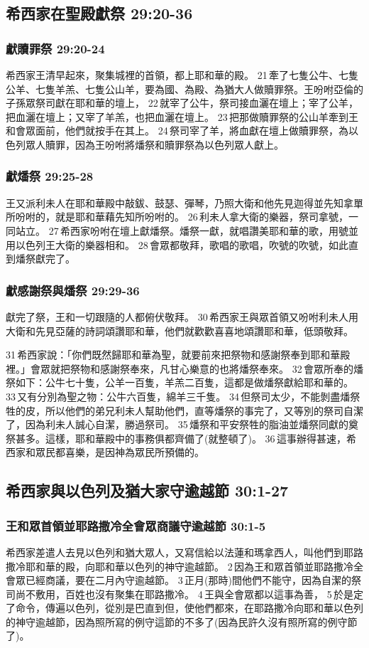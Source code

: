 \subsection{希西家在聖殿獻祭 29:20-36}
\subsubsection{獻贖罪祭 29:20-24}
希西家王清早起來，聚集城裡的首領，都上耶和華的殿。 21 牽了七隻公牛、七隻公羊、七隻羊羔、七隻公山羊，要為國、為殿、為猶大人做贖罪祭。王吩咐亞倫的子孫眾祭司獻在耶和華的壇上， 22 就宰了公牛，祭司接血灑在壇上；宰了公羊，把血灑在壇上；又宰了羊羔，也把血灑在壇上。 23 把那做贖罪祭的公山羊牽到王和會眾面前，他們就按手在其上。 24 祭司宰了羊，將血獻在壇上做贖罪祭，為以色列眾人贖罪，因為王吩咐將燔祭和贖罪祭為以色列眾人獻上。

\subsubsection{獻燔祭 29:25-28}
王又派利未人在耶和華殿中敲鈸、鼓瑟、彈琴，乃照大衛和他先見迦得並先知拿單所吩咐的，就是耶和華藉先知所吩咐的。 26 利未人拿大衛的樂器，祭司拿號，一同站立。 27 希西家吩咐在壇上獻燔祭。燔祭一獻，就唱讚美耶和華的歌，用號並用以色列王大衛的樂器相和。 28 會眾都敬拜，歌唱的歌唱，吹號的吹號，如此直到燔祭獻完了。

\subsubsection{獻感謝祭與燔祭 29:29-36}
獻完了祭，王和一切跟隨的人都俯伏敬拜。 30 希西家王與眾首領又吩咐利未人用大衛和先見亞薩的詩詞頌讚耶和華，他們就歡歡喜喜地頌讚耶和華，低頭敬拜。

31 希西家說：「你們既然歸耶和華為聖，就要前來把祭物和感謝祭奉到耶和華殿裡。」會眾就把祭物和感謝祭奉來，凡甘心樂意的也將燔祭奉來。 32 會眾所奉的燔祭如下：公牛七十隻，公羊一百隻，羊羔二百隻，這都是做燔祭獻給耶和華的。 33 又有分別為聖之物：公牛六百隻，綿羊三千隻。 34 但祭司太少，不能剝盡燔祭牲的皮，所以他們的弟兄利未人幫助他們，直等燔祭的事完了，又等別的祭司自潔了，因為利未人誠心自潔，勝過祭司。 35 燔祭和平安祭牲的脂油並燔祭同獻的奠祭甚多。這樣，耶和華殿中的事務俱都齊備了(就整頓了)。 36 這事辦得甚速，希西家和眾民都喜樂，是因神為眾民所預備的。

\subsection{希西家與以色列及猶大家守逾越節 30:1-27}
\subsubsection{王和眾首領並耶路撒冷全會眾商議守逾越節 30:1-5}
希西家差遣人去見以色列和猶大眾人，又寫信給以法蓮和瑪拿西人，叫他們到耶路撒冷耶和華的殿，向耶和華以色列的神守逾越節。 2 因為王和眾首領並耶路撒冷全會眾已經商議，要在二月內守逾越節。 3 正月(那時)間他們不能守，因為自潔的祭司尚不敷用，百姓也沒有聚集在耶路撒冷。 4 王與全會眾都以這事為善， 5 於是定了命令，傳遍以色列，從別是巴直到但，使他們都來，在耶路撒冷向耶和華以色列的神守逾越節，因為照所寫的例守這節的不多了(因為民許久沒有照所寫的例守節了)。


